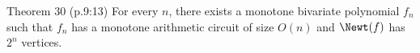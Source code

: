 \begin{sourceresult}{Theorem 30 (p.9:13)}
For every $n$, there exists a monotone bivariate polynomial $f_n$ such that $f_n$ has a monotone arithmetic circuit of size $O(n)$ and $\Newt(f)$ has $2^n$ vertices.
\end{sourceresult}
